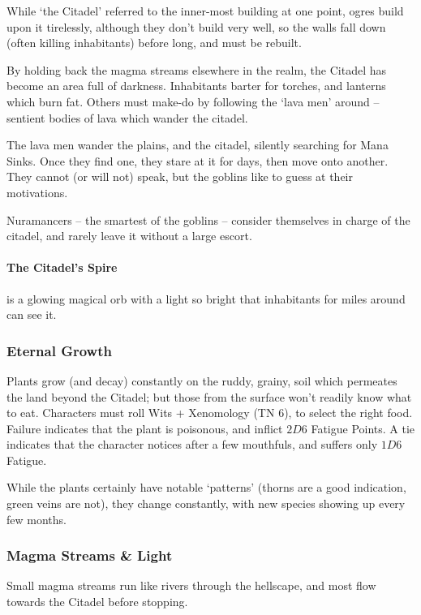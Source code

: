 \begin{multicols}{2}
While `the Citadel' referred to the inner-most building at one point, ogres build upon it tirelessly, although they don't build very well, so the walls fall down (often killing inhabitants) before long, and must be rebuilt.

By holding back the magma streams elsewhere in the realm, the Citadel has become an area full of darkness.
Inhabitants barter for torches, and lanterns which burn fat.
Others must make-do by following the `lava men' around -- sentient bodies of lava which wander the citadel.

The lava men wander the plains, and the citadel, silently searching for Mana Sinks.
Once they find one, they stare at it for days, then move onto another.
They cannot (or will not) speak, but the goblins like to guess at their motivations.

Nuramancers -- the smartest of the goblins -- consider themselves in charge of the citadel, and rarely leave it without a large escort.

\paragraph{The Citadel's Spire}
is a glowing magical orb with a light so bright that inhabitants for miles around can see it.

\subsubsection{Eternal Growth}

Plants grow (and decay) constantly on the ruddy, grainy, soil which permeates the land beyond the Citadel; but those from the surface won't readily know what to eat.
Characters must roll Wits + Xenomology (TN 6), to select the right food.
Failure indicates that the plant is poisonous, and inflict $2D6$ Fatigue Points.
A tie indicates that the character notices after a few mouthfuls, and suffers only $1D6$ Fatigue.

While the plants certainly have notable `patterns' (thorns are a good indication, green veins are not), they change constantly, with new species showing up every few months.

\subsubsection{Magma Streams \& Light}

Small magma streams run like rivers through the hellscape, and most flow towards the Citadel before stopping.


\end{multicols}
